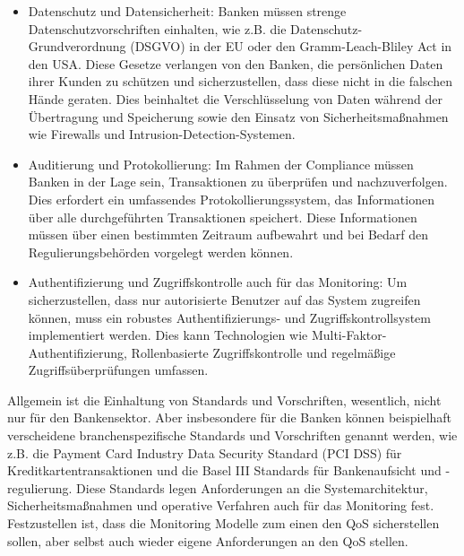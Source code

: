 \begin{itemize}
\item Datenschutz und Datensicherheit: Banken müssen strenge Datenschutzvorschriften einhalten, wie z.B. die Datenschutz-Grundverordnung (DSGVO) in der EU oder den Gramm-Leach-Bliley Act in den USA. Diese Gesetze verlangen von den Banken, die persönlichen Daten ihrer Kunden zu schützen und sicherzustellen, dass diese nicht in die falschen Hände geraten. Dies beinhaltet die Verschlüsselung von Daten während der Übertragung und Speicherung sowie den Einsatz von Sicherheitsmaßnahmen wie Firewalls und Intrusion-Detection-Systemen.
\item Auditierung und Protokollierung: Im Rahmen der Compliance müssen Banken in der Lage sein, Transaktionen zu überprüfen und nachzuverfolgen. Dies erfordert ein umfassendes Protokollierungssystem, das Informationen über alle durchgeführten Transaktionen speichert. Diese Informationen müssen über einen bestimmten Zeitraum aufbewahrt und bei Bedarf den Regulierungsbehörden vorgelegt werden können.
\item Authentifizierung und Zugriffskontrolle auch für das Monitoring: Um sicherzustellen, dass nur autorisierte Benutzer auf das System zugreifen können, muss ein robustes Authentifizierungs- und Zugriffskontrollsystem implementiert werden. Dies kann Technologien wie Multi-Faktor-Authentifizierung, Rollenbasierte Zugriffskontrolle und regelmäßige Zugriffsüberprüfungen umfassen.
\end{itemize}
Allgemein ist die Einhaltung von Standards und Vorschriften, wesentlich, nicht nur für den Bankensektor. Aber insbesondere für die Banken können beispielhaft verscheidene branchenspezifische Standards und Vorschriften genannt werden, wie z.B. die Payment Card Industry Data Security Standard (PCI DSS) für Kreditkartentransaktionen und die Basel III Standards für Bankenaufsicht und -regulierung. Diese Standards legen Anforderungen an die Systemarchitektur, Sicherheitsmaßnahmen und operative Verfahren auch für das Monitoring fest. 
Festzustellen ist, dass die Monitoring Modelle zum einen den QoS sicherstellen sollen, aber selbst auch wieder eigene Anforderungen an den QoS stellen. 

